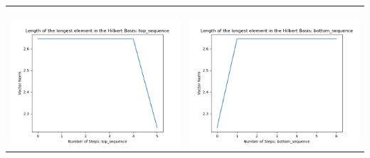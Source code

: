 \documentclass[10pt]{article}
\begin{document}
\begin{tabular}{c|c}
\begin{minipage}{.45\textwidth}
\end{minipage} \\ \\
\hline \\\begin{minipage}{.45\textwidth}
\includegraphics[width=\textwidth]{"DATA/5d/6 generators 1 bound E/top_sequence LENGTH"}
\end{minipage} &
\begin{minipage}{.45\textwidth}
\includegraphics[width=\textwidth]{"DATA/5d/6 generators 1 bound E bottomup/bottom_sequence LENGTH"}
\end{minipage}
\end{tabular}
\end{document}
